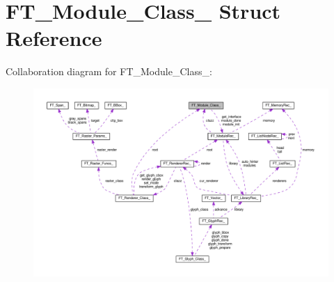 \hypertarget{structFT__Module__Class__}{}\section{F\+T\+\_\+\+Module\+\_\+\+Class\+\_\+ Struct Reference}
\label{structFT__Module__Class__}


Collaboration diagram for F\+T\+\_\+\+Module\+\_\+\+Class\+\_\+\+:
\nopagebreak
\begin{figure}[H]
\begin{center}
\leavevmode
\includegraphics[width=350pt]{structFT__Module__Class____coll__graph}
\end{center}
\end{figure}
